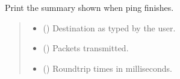 \documentclass[a4paper,11pt,english,openany,oneside]{sphinxmanual}
\begin{document}

\begin{fulllineitems}
\label{\detokenize{ping:my_ping.print_stats}}
\pysigstartsignatures
{}
\pysigstopsignatures
\sphinxAtStartPar
Print the summary shown when ping finishes.
\begin{quote}\begin{description}
\begin{itemize}
\item {} 
\sphinxAtStartPar
{} () \textendash{} Destination as typed by the user.

\item {} 
\sphinxAtStartPar
{} () \textendash{} Packets transmitted.

\item {} 
\sphinxAtStartPar
{} () \textendash{} Round\sphinxhyphen{}trip times in milliseconds.

\end{itemize}

\end{description}\end{quote}

\sphinxAtStartPar
{}

\begin{sphinxVerbatim}[commandchars=\\\{\}]
  


\end{sphinxVerbatim}
\end{fulllineitems}
\end{document}

